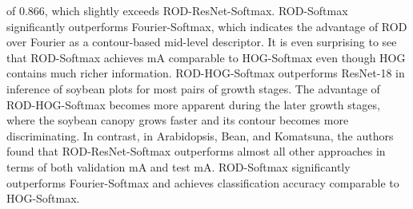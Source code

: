of 0.866, which slightly exceeds ROD-ResNet-Softmax. ROD-Softmax significantly outperforms Fourier-Softmax, which indicates the advantage of ROD over Fourier as a
contour-based mid-level descriptor. It is even surprising to see that ROD-Softmax achieves mA comparable to HOG-Softmax even though HOG contains much richer information.
ROD-HOG-Softmax outperforms ResNet-18 in inference of soybean plots for most pairs of growth stages. The advantage of ROD-HOG-Softmax becomes more apparent during the
later growth stages, where the soybean canopy grows faster and its contour becomes more discriminating. In contrast, in Arabidopsis, Bean, and Komatsuna, the authors
found that ROD-ResNet-Softmax outperforms almost all other approaches in terms of both validation mA and test mA. ROD-Softmax significantly outperforms Fourier-Softmax
and achieves classification accuracy comparable to HOG-Softmax.




